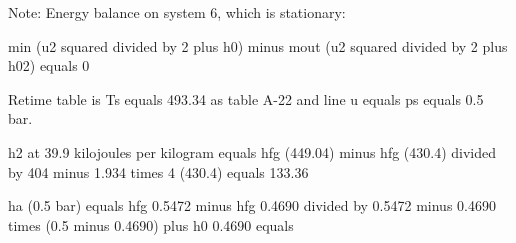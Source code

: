 Note: Energy balance on system 6, which is stationary:

min (u2 squared divided by 2 plus h0) minus mout (u2 squared divided by 2 plus h02) equals 0

Retime table is Ts equals 493.34 as table A-22 and line u equals ps equals 0.5 bar.

h2 at 39.9 kilojoules per kilogram equals hfg (449.04) minus hfg (430.4) divided by 404 minus 1.934 times 4 (430.4) equals 133.36

ha (0.5 bar) equals hfg 0.5472 minus hfg 0.4690 divided by 0.5472 minus 0.4690 times (0.5 minus 0.4690) plus h0 0.4690 equals